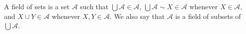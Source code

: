 A field of sets is a set $\mathcal{A}$ such that $\bigcup \mathcal{A} \in \mathcal{A}$, $\bigcup \mathcal{A} \sim X \in \mathcal{A}$ whenever $X \in \mathcal{A}$, and $X \cup Y \in \mathcal{A}$ whenever $X, Y \in \mathcal{A}$. We also say that $\mathcal{A}$ is a field of subsets of $\bigcup \mathcal{A}$.
